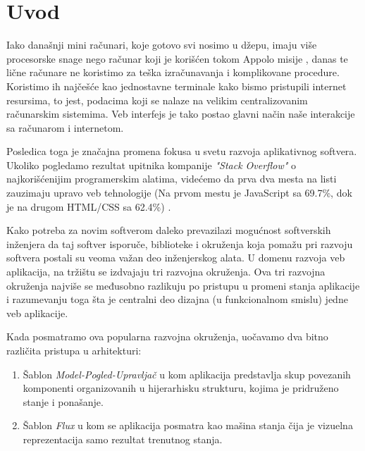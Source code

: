 \documentclass[12pt,oneside]{memoir}
\begin{document}
\frontmatter
\naslovna
\komisija
\apstrakt
\tableofcontents*

\mainmatter

\chapter{Uvod}
Iako današnji mini računari, koje gotovo svi nosimo u džepu, imaju više procesorske snage 
nego računar koji je korišćen tokom Appolo misije \cite{apollo}, 
danas te lične računare ne koristimo za teška izračunavanja i komplikovane procedure. 
Koristimo ih najčešće kao jednostavne terminale kako bismo pristupili internet resursima,
to jest, podacima koji se nalaze na velikim centralizovanim računarskim sistemima. 
Veb interfejs je tako postao glavni način naše interakcije sa računarom i internetom.

Posledica toga je značajna promena fokusa u svetu razvoja aplikativnog softvera.
Ukoliko pogledamo rezultat upitnika kompanije \emph{"Stack Overflow"}
o najkorišćenijim programerskim alatima, videćemo da prva dva mesta na listi
zauzimaju upravo veb tehnologije (Na prvom mestu je JavaScript sa 69.7\%, dok je na 
drugom HTML/CSS sa 62.4\%) \cite{StackOverflowSurvey}.

Kako potreba za novim softverom daleko prevazilazi mogućnost softverskih inženjera 
da taj softver isporuče, biblioteke i okruženja koja pomažu pri razvoju softvera 
postali su veoma važan deo inženjerskog alata.
U domenu razvoja veb aplikacija, na tržištu se izdvajaju tri razvojna okruženja. 
Ova tri razvojna okruženja najviše se međusobno razlikuju po pristupu u promeni 
stanja aplikacije i razumevanju
toga šta je centralni deo dizajna (u funkcionalnom smislu) jedne veb aplikacije.

Kada posmatramo ova popularna razvojna okruženja, uočavamo dva bitno različita 
pristupa u arhitekturi:
\begin{enumerate}
  \item Šablon \emph{Model-Pogled-Upravljač} u kom aplikacija predstavlja skup
   povezanih komponenti organizovanih u hijerarhisku strukturu, kojima je 
   pridruženo stanje i ponašanje.
  \item Šablon \emph{Flux} u kom se aplikacija posmatra kao mašina stanja čija je 
  vizuelna reprezentacija samo rezultat trenutnog stanja.
\end{enumerate}
\end{document}
